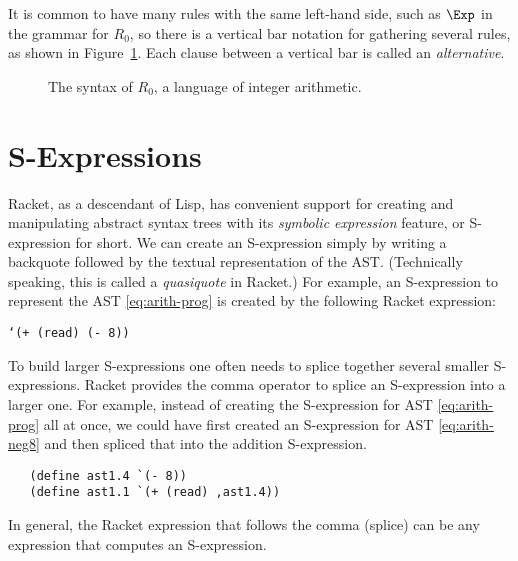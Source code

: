 \documentclass[11pt]{book}
\begin{document}
It is common to have many rules with the same left-hand side, such as
$\Exp$ in the grammar for $R_0$, so there is a vertical bar notation
for gathering several rules, as shown in
Figure~\ref{fig:r0-syntax}. Each clause between a vertical bar is
called an {\em alternative}.

\begin{figure}[tp]
\caption{The syntax of $R_0$, a language of integer arithmetic.}
\label{fig:r0-syntax}
\end{figure}

\section{S-Expressions}
\label{sec:s-expr}

Racket, as a descendant of Lisp, has
convenient support for creating and manipulating abstract syntax trees
with its \emph{symbolic expression} feature, or S-expression for
short. We can create an S-expression simply by writing a backquote
followed by the textual representation of the AST. (Technically
speaking, this is called a \emph{quasiquote} in Racket.)  For example,
an S-expression to represent the AST \eqref{eq:arith-prog} is created
by the following Racket expression:
\begin{center}
\texttt{`(+ (read) (- 8))}
\end{center}

To build larger S-expressions one often needs to splice together
several smaller S-expressions. Racket provides the comma operator to
splice an S-expression into a larger one. For example, instead of
creating the S-expression for AST \eqref{eq:arith-prog} all at once,
we could have first created an S-expression for AST
\eqref{eq:arith-neg8} and then spliced that into the addition
S-expression.
\begin{lstlisting}
   (define ast1.4 `(- 8))
   (define ast1.1 `(+ (read) ,ast1.4))
\end{lstlisting}
In general, the Racket expression that follows the comma (splice)
can be any expression that computes an S-expression.
\end{document}
